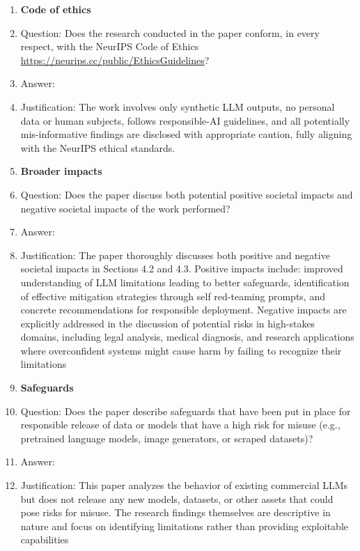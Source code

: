 \documentclass{article}
\begin{document}
\begin{enumerate}
\item {\bf Code of ethics}
    \item[] Question: Does the research conducted in the paper conform, in every respect, with the NeurIPS Code of Ethics \url{https://neurips.cc/public/EthicsGuidelines}?
    \item[] Answer: \answerYes{} %
    \item[] Justification: The work involves only synthetic LLM outputs, no personal data or human subjects, follows responsible-AI guidelines, and all potentially mis-informative findings are disclosed with appropriate caution, fully aligning with the NeurIPS ethical standards.

\item {\bf Broader impacts}
    \item[] Question: Does the paper discuss both potential positive societal impacts and negative societal impacts of the work performed?
    \item[] Answer: \answerYes{}
    \item[] Justification: The paper thoroughly discusses both positive and negative societal impacts in Sections 4.2 and 4.3. Positive impacts include: improved understanding of LLM limitations leading to better safeguards, identification of effective mitigation strategies through self red-teaming prompts, and concrete recommendations for responsible deployment. Negative impacts are explicitly addressed in the discussion of potential risks in high-stakes domains, including legal analysis, medical diagnosis, and research applications where overconfident systems might cause harm by failing to recognize their limitations

\item {\bf Safeguards}
    \item[] Question: Does the paper describe safeguards that have been put in place for responsible release of data or models that have a high risk for misuse (e.g., pretrained language models, image generators, or scraped datasets)?
    \item[] Answer: \answerNA{} %
    \item[] Justification: This paper analyzes the behavior of existing commercial LLMs but does not release any new models, datasets, or other assets that could pose risks for misuse. The research findings themselves are descriptive in nature and focus on identifying limitations rather than providing exploitable capabilities


\end{enumerate}
\end{document}
